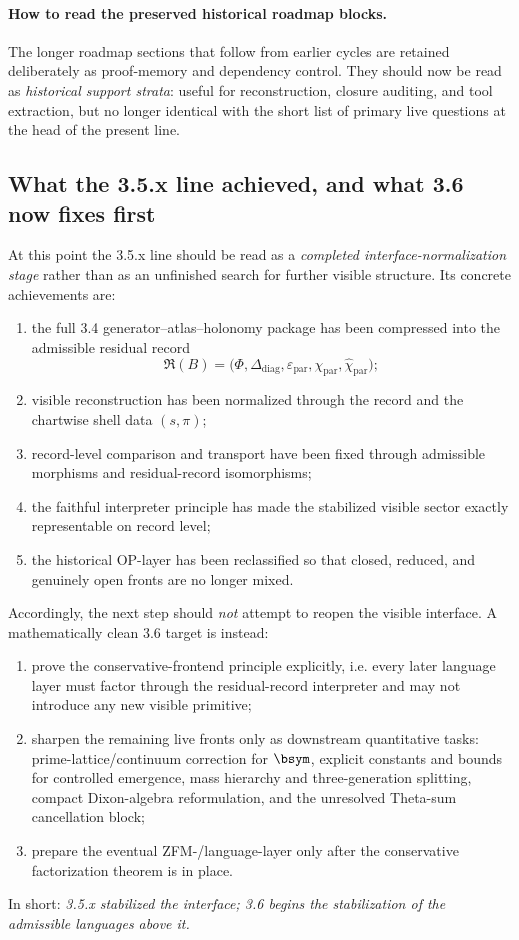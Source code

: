 \paragraph{How to read the preserved historical roadmap blocks.}
The longer roadmap sections that follow from earlier cycles are retained deliberately as proof-memory and dependency control. They should now be read as \emph{historical support strata}: useful for reconstruction, closure auditing, and tool extraction, but no longer identical with the short list of primary live questions at the head of the present line.

\subsection*{What the 3.5.x line achieved, and what 3.6 now fixes first}
At this point the 3.5.x line should be read as a \emph{completed interface-normalization stage} rather than as an unfinished search for further visible structure.
Its concrete achievements are:
\begin{enumerate}[leftmargin=2em]
  \item the full 3.4 generator--atlas--holonomy package has been compressed into the admissible residual record
  \[
  \mathfrak R(B)=\bigl(\Phi,\Delta_{\mathrm{diag}},\varepsilon_{\mathrm{par}},\chi_{\mathrm{par}},\widehat\chi_{\mathrm{par}}\bigr);
  \]
  \item visible reconstruction has been normalized through the record and the chartwise shell data \((s,\pi)\);
  \item record-level comparison and transport have been fixed through admissible morphisms and residual-record isomorphisms;
  \item the faithful interpreter principle has made the stabilized visible sector exactly representable on record level;
  \item the historical OP-layer has been reclassified so that closed, reduced, and genuinely open fronts are no longer mixed.
\end{enumerate}
Accordingly, the next step should \emph{not} attempt to reopen the visible interface.
A mathematically clean 3.6 target is instead:
\begin{enumerate}[leftmargin=2em,label=(\roman*)]
  \item prove the conservative-frontend principle explicitly, i.e. every later language layer must factor through the residual-record interpreter and may not introduce any new visible primitive;
  \item sharpen the remaining live fronts only as downstream quantitative tasks: prime-lattice/continuum correction for \(\bsym\), explicit constants and bounds for controlled emergence, mass hierarchy and three-generation splitting, compact Dixon-algebra reformulation, and the unresolved Theta-sum cancellation block;
  \item prepare the eventual ZFM-/language-layer only after the conservative factorization theorem is in place.
\end{enumerate}
In short: \emph{3.5.x stabilized the interface; 3.6 begins the stabilization of the admissible languages above it.}

